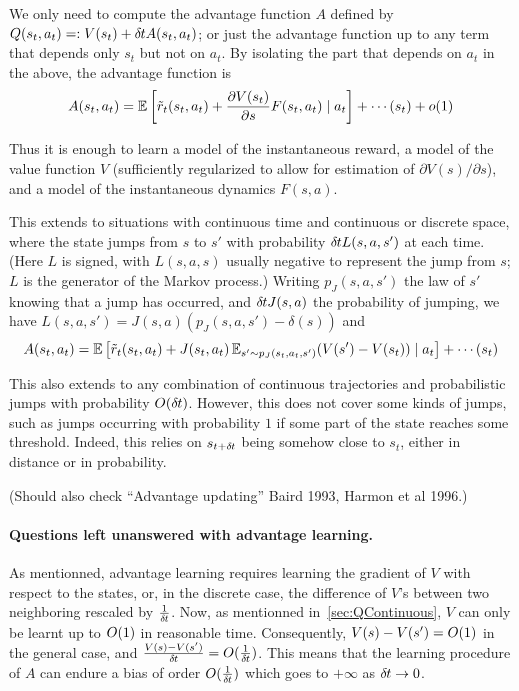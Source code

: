 We only need to compute the advantage function $A$ defined by
$Q(s_t,a_t)=\mathrel{\mathop{:}} V(s_t)+\delta\hspace{-.06em}t A(s_t,a_t)$; or just the advantage function
up to any term that depends only $s_t$ but not on $a_t$. By isolating the
part that
depends on $a_t$ in the above, the advantage function is
\begin{equation}
A(s_t,a_t)=\mathbb{E}\left[\tilde{r}_t(s_t,a_t)+\frac{\partial
V(s_t)}{\partial
s}F(s_t,a_t)\mid a_t\right]+\cdots(s_t)+o(1)
\end{equation}

Thus it is enough to learn a model of the instantaneous reward, a model
of the value function $V$ (sufficiently regularized to allow for
estimation of $\partial V(s)/\partial s$), and a model of the
instantaneous dynamics $F(s,a)$.

This extends to situations with continuous time and continuous or
discrete space, where the state jumps from $s$ to $s'$ with probability $\delta\hspace{-.06em}t
L(s,a,s')$ at each time. (Here $L$ is signed, with $L(s,a,s)$ usually
negative to represent the jump from $s$; $L$ is the generator of the
Markov process.) Writing $p_J(s,a,s')$ the law of
$s'$ knowing that a jump has occurred, and $\delta\hspace{-.06em}t J(s,a)$ the
probability of jumping, we have $L(s,a,s')=J(s,a)(p_J(s,a,s')-\delta(s))$
and
\begin{equation}
A(s_t,a_t)=\mathbb{E}\left[\tilde{r}_t(s_t,a_t)+J(s_t,a_t)\,\mathbb{E}_{s'\sim
p_J(s_t,a_t,s')} (V(s')-V(s_t))
\mid a_t\right]+\cdots(s_t)
\end{equation}

This also extends to any combination of continuous trajectories and
probabilistic jumps with probability $O(\delta\hspace{-.06em}t)$. However, this does not
cover some kinds of jumps, such as jumps occurring with probability $1$
if some part of the state reaches some threshold. Indeed, this relies on
$s_{t+\delta\hspace{-.06em}t}$ being somehow close to $s_t$, either in distance or in
probability.

(Should also check ``Advantage updating'' Baird 1993, Harmon et al 1996.)

\paragraph{Questions left unanswered with advantage learning.}
As mentionned, advantage learning requires learning the gradient of $V$
with respect to the states, or, in the discrete case, the difference of
$V$'s between two neighboring rescaled by $\frac{1}{\delta\hspace{-.06em}t}$. Now, as
mentionned in~\ref{sec:QContinuous}, $V$ can only be learnt up to $O (1)$
in reasonable time. Consequently, $V(s) - V(s') = O (1)$ in the general case,
and $\frac{V(s) - V(s')}{\delta\hspace{-.06em}t} = O (\frac{1}{\delta\hspace{-.06em}t})$. This means that
the learning procedure of $A$ can endure a bias of order $O (\frac{1}{\delta\hspace{-.06em}t})$
which goes to $+\infty$ as $\delta\hspace{-.06em}t \to 0$.

